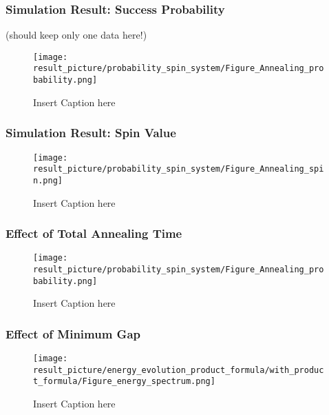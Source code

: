\documentclass{beamer}
\begin{document}
\begin{frame}
	\frametitle{Simulation Result: Success Probability}
	(should keep only one data here!)
	\begin{figure}
		\centering
		\texttt{[image: result\_picture/probability\_spin\_system/Figure\_Annealing\_probability.png]}

		\caption{Insert Caption here}
	\end{figure}
\end{frame}

\begin{frame}
	\frametitle{Simulation Result: Spin Value}
	\begin{figure}
		\centering
		\texttt{[image: result\_picture/probability\_spin\_system/Figure\_Annealing\_spin.png]}
		\caption{Insert Caption here}
	\end{figure}
\end{frame}

\begin{frame}
	\frametitle{Effect of Total Annealing Time}
	\begin{figure}
		\centering
		\texttt{[image: result\_picture/probability\_spin\_system/Figure\_Annealing\_probability.png]}
		
		\caption{Insert Caption here}
	\end{figure}
\end{frame}

\begin{frame}
	\frametitle{Effect of Minimum Gap}
	\begin{figure}
		\centering
		\texttt{[image: result\_picture/energy\_evolution\_product\_formula/with\_product\_formula/Figure\_energy\_spectrum.png]}
		
		\caption{Insert Caption here}
	\end{figure}
\end{frame}
\end{document}
